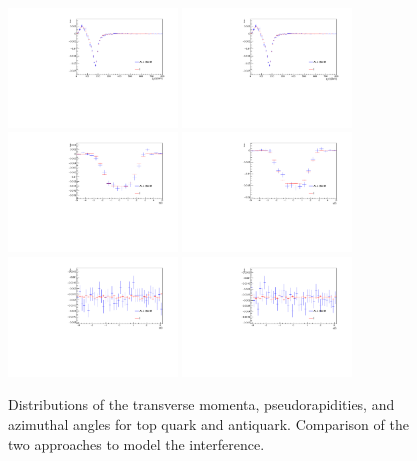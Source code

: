\begin{figure} \centering
  \includegraphics[width=0.4\textwidth]{fig/chapt4/gen_plots/top_pt_compare.pdf}
  \includegraphics[width=0.4\textwidth]{fig/chapt4/gen_plots/tbar_pt_compare.pdf}\\
  \includegraphics[width=0.4\textwidth]{fig/chapt4/gen_plots/top_eta_compare.pdf}
  \includegraphics[width=0.4\textwidth]{fig/chapt4/gen_plots/tbar_eta_compare.pdf}\\
  \includegraphics[width=0.4\textwidth]{fig/chapt4/gen_plots/top_phi_compare.pdf}
  \includegraphics[width=0.4\textwidth]{fig/chapt4/gen_plots/tbar_phi_compare.pdf}
  \caption{Distributions of the transverse momenta, pseudorapidities, and azimuthal angles for top quark and antiquark. Comparison of the two approaches to model the interference.}
  \label{fig:comparison_top}
\end{figure}

